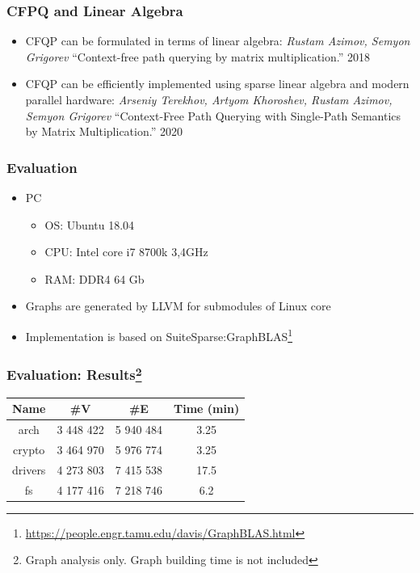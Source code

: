 \documentclass[xcolor=table]{beamer}
\begin{document}
\begin{frame}
  \frametitle{CFPQ and Linear Algebra}

  \begin{itemize}
    \item CFQP can be formulated in terms of linear algebra: \emph{Rustam Azimov, Semyon Grigorev} ``Context-free path querying by matrix multiplication.'' 2018 
    \item CFQP can be efficiently implemented using sparse linear algebra and modern parallel hardware: \emph{Arseniy Terekhov, Artyom Khoroshev, Rustam Azimov, Semyon Grigorev} ``Context-Free Path Querying with Single-Path Semantics by Matrix Multiplication.'' 2020 
  \end{itemize}
\end{frame}



\begin{frame} \frametitle{Evaluation}
\begin{itemize}
  \item PC
  \begin{itemize}
   \item OS: Ubuntu 18.04
   \item CPU: Intel core i7 8700k 3,4GHz
   \item RAM: DDR4 64 Gb
  \end{itemize}
  \item Graphs are generated by LLVM for submodules of Linux core
  \item Implementation is based on SuiteSparse:GraphBLAS\footnote{\url{https://people.engr.tamu.edu/davis/GraphBLAS.html}}
\end{itemize}
\end{frame}

\begin{frame}[fragile] \frametitle{Evaluation: Results\footnote{Graph analysis only. Graph building time is not included}}
\begin{center}
  {
  \begin{tabular}{| c | c | c | c |}
      \hline
      
      Name           & \#V        & \#E        & Time (min) \\ 
      \hline
      \hline
      arch           & 3 448 422  & 5 940 484  & 3.25       \\
      crypto         & 3 464 970  & 5 976 774  & 3.25       \\
      drivers        & 4 273 803  & 7 415 538  & 17.5       \\
      fs             & 4 177 416  & 7 218 746  & 6.2        \\  
      \hline
    \end{tabular}
    }
 \end{center}
\end{frame}
\end{document}
